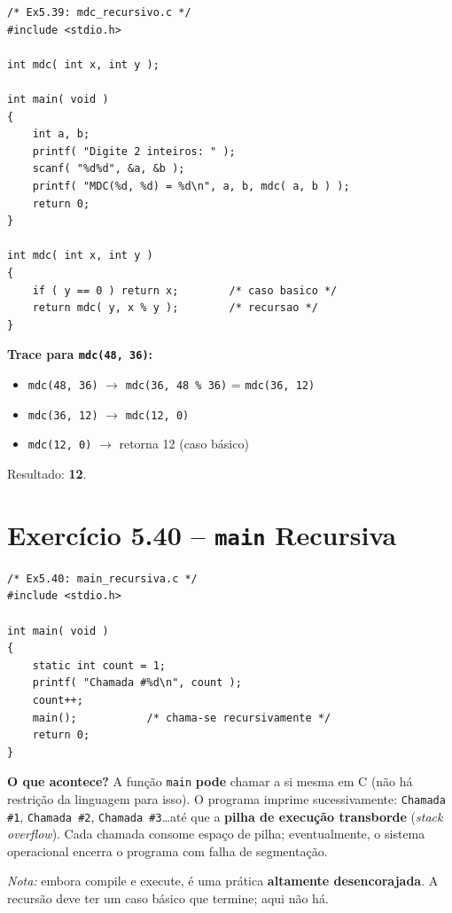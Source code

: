 \documentclass[12pt,a4paper]{article}
\begin{document}
\begin{respostabox}
\begin{lstlisting}
/* Ex5.39: mdc_recursivo.c */
#include <stdio.h>

int mdc( int x, int y );

int main( void )
{
    int a, b;
    printf( "Digite 2 inteiros: " );
    scanf( "%d%d", &a, &b );
    printf( "MDC(%d, %d) = %d\n", a, b, mdc( a, b ) );
    return 0;
}

int mdc( int x, int y )
{
    if ( y == 0 ) return x;        /* caso basico */
    return mdc( y, x % y );        /* recursao */
}
\end{lstlisting}

\textbf{Trace para \texttt{mdc(48, 36)}:}
\begin{itemize}[noitemsep]
  \item \texttt{mdc(48, 36)} $\to$ \texttt{mdc(36, 48 \% 36)} = \texttt{mdc(36, 12)}
  \item \texttt{mdc(36, 12)} $\to$ \texttt{mdc(12, 0)}
  \item \texttt{mdc(12, 0)} $\to$ retorna 12 (caso básico)
\end{itemize}
Resultado: \textbf{12}.
\end{respostabox}

\section{Exercício 5.40 -- \texttt{main} Recursiva}

\begin{respostabox}
\begin{lstlisting}
/* Ex5.40: main_recursiva.c */
#include <stdio.h>

int main( void )
{
    static int count = 1;
    printf( "Chamada #%d\n", count );
    count++;
    main();           /* chama-se recursivamente */
    return 0;
}
\end{lstlisting}

\textbf{O que acontece?} A função \texttt{main} \textbf{pode} chamar a si mesma em
C (não há restrição da linguagem para isso). O programa imprime sucessivamente:
\texttt{Chamada \#1}, \texttt{Chamada \#2}, \texttt{Chamada \#3}\ldots até que a
\textbf{pilha de execução transborde} (\textit{stack overflow}). Cada chamada
consome espaço de pilha; eventualmente, o sistema operacional encerra o programa
com falha de segmentação.

\textit{Nota:} embora compile e execute, é uma prática \textbf{altamente desencorajada}.
A recursão deve ter um caso básico que termine; aqui não há.
\end{respostabox}
\end{document}
